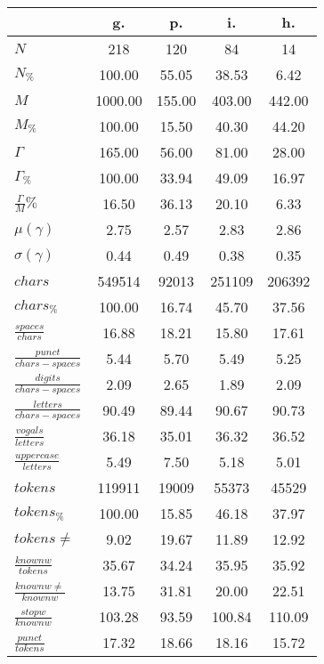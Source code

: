 \begin{table}[h!]
\begin{center}
\begin{tabular}{| l || c | c | c | c |}\hline
 & {\bf g.} & {\bf p.} & {\bf i.} & {\bf h.} \\\hline\hline
$N$ & 218  & 120  & 84  & 14 \\
$N_{\%}$ & 100.00  & 55.05  & 38.53  & 6.42 \\\hline
$M$ & 1000.00  & 155.00  & 403.00  & 442.00 \\
$M_{\%}$ & 100.00  & 15.50  & 40.30  & 44.20 \\\hline
$\Gamma$ & 165.00  & 56.00  & 81.00  & 28.00 \\
$\Gamma_{\%}$ & 100.00  & 33.94  & 49.09  & 16.97 \\\hline
$\frac{\Gamma}{M}\%$ & 16.50  & 36.13  & 20.10  & 6.33 \\
$\mu(\gamma)$ & 2.75  & 2.57  & 2.83  & 2.86 \\
$\sigma(\gamma)$ & 0.44  & 0.49  & 0.38  & 0.35 \\\hline\hline
$chars$ & 549514  & 92013  & 251109  & 206392 \\
$chars_{\%}$ & 100.00  & 16.74  & 45.70  & 37.56 \\\hline
$\frac{spaces}{chars}$ & 16.88  & 18.21  & 15.80  & 17.61 \\
$\frac{punct}{chars-spaces}$ & 5.44  & 5.70  & 5.49  & 5.25 \\
$\frac{digits}{chars-spaces}$ & 2.09  & 2.65  & 1.89  & 2.09 \\\hline
$\frac{letters}{chars-spaces}$ & 90.49  & 89.44  & 90.67  & 90.73 \\
$\frac{vogals}{letters}$ & 36.18  & 35.01  & 36.32  & 36.52 \\
$\frac{uppercase}{letters}$ & 5.49  & 7.50  & 5.18  & 5.01 \\\hline\hline
$tokens$ & 119911  & 19009  & 55373  & 45529 \\
$tokens_{\%}$ & 100.00  & 15.85  & 46.18  & 37.97 \\
$tokens \neq$ & 9.02  & 19.67  & 11.89  & 12.92 \\\hline
$\frac{knownw}{tokens}$ & 35.67  & 34.24  & 35.95  & 35.92 \\
$\frac{knownw \neq}{knownw}$ & 13.75  & 31.81  & 20.00  & 22.51 \\\hline
$\frac{stopw}{knownw}$ & 103.28  & 93.59  & 100.84  & 110.09 \\
$\frac{punct}{tokens}$ & 17.32  & 18.66  & 18.16  & 15.72 \\

\end{tabular}
\end{center}
\end{table}
